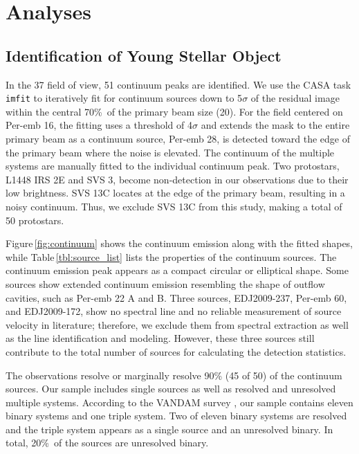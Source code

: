 \documentclass[twocolumn]{aastex62}
\begin{document}

% 

\section{Analyses}
\label{sec:analyses}

\subsection{Identification of Young Stellar Object}
\label{sec:continuum}
In the 37 field of view, 51 continuum peaks are identified.  We use the CASA task \texttt{imfit} to iteratively fit for continuum sources down to 5$\sigma$ of the residual image within the central 70\%\ of the primary beam size (20\arcsec).  For the field centered on Per-emb 16, the fitting uses a threshold of 4$\sigma$ and extends the mask to the entire primary beam as a continuum source, Per-emb 28, is detected toward the edge of the primary beam where the noise is elevated.  The continuum of the multiple systems are manually fitted to the individual continuum peak.  Two protostars, L1448 IRS 2E and SVS 3, become non-detection in our observations due to their low brightness.  SVS 13C locates at the edge of the primary beam, resulting in a noisy continuum.  Thus, we exclude SVS 13C from this study, making a total of 50 protostars.



Figure\,\ref{fig:continuum} shows the continuum emission along with the fitted shapes, while Table\,\ref{tbl:source_list} lists the properties of the continuum sources.  The continuum emission peak appears as a compact circular or elliptical shape.  Some sources show extended continuum emission resembling the shape of outflow cavities, such as Per-emb 22 A and B.  Three sources, EDJ2009-237, Per-emb 60, and EDJ2009-172, show no spectral line and no reliable measurement of source velocity in literature; therefore, we exclude them from spectral extraction as well as the line identification and modeling.  However, these three sources still contribute to the total number of sources for calculating the detection statistics.

The observations resolve or marginally resolve 90\% (45 of 50) of the continuum sources.  Our sample includes single sources as well as resolved and unresolved multiple systems.  According to the VANDAM survey \citep{2016ApJ...818...73T}, our sample contains eleven binary systems and one triple system.  Two of eleven binary systems are resolved and the triple system appears as a single source and an unresolved binary.  In total, 20\%\ of the sources are unresolved binary. 
\end{document}
